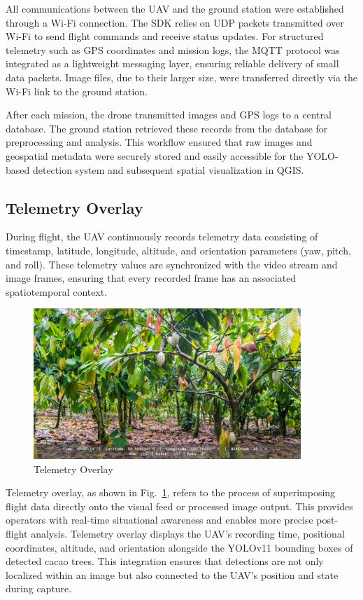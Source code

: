 All communications between the UAV and the ground station were established through a
Wi-Fi connection. The SDK relies on UDP packets transmitted over Wi-Fi to send
flight commands and receive status updates. For structured telemetry such as GPS coordinates
and mission logs, the MQTT protocol was integrated as a lightweight messaging layer,
ensuring reliable delivery of small data packets. Image files, due to their larger size, were
transferred directly via the Wi-Fi link to the ground station.

After each mission, the drone transmitted images and GPS logs to a central database.
The ground station retrieved these records from the database for preprocessing
and analysis. This workflow ensured that raw images and geospatial metadata were securely
stored and easily accessible for the YOLO-based detection system and subsequent
spatial visualization in QGIS.

\subsection{Telemetry Overlay}

During flight, the UAV continuously records telemetry data consisting of timestamp, latitude, longitude, altitude, and orientation parameters (yaw, pitch, and roll). These telemetry values are synchronized with the video stream and image frames, ensuring that every recorded frame has an associated spatiotemporal context.

\begin{figure}[H]
	\centering
	\caption{Telemetry Overlay}
	\label{fig:telemetry_overlay}
	\includegraphics[width=0.9\textwidth]{figures/Telemetry.pdf}
\end{figure}

Telemetry overlay, as shown in Fig.~\ref{fig:telemetry_overlay}, refers to the process of superimposing flight data directly onto the visual feed or processed image output. This provides operators with real-time situational awareness and enables more precise post-flight analysis. Telemetry overlay displays the UAV’s recording time, positional coordinates, altitude, and orientation alongside the YOLOv11 bounding boxes of detected cacao trees. This integration ensures that detections are not only localized within an image but also connected to the UAV’s position and state during capture.

